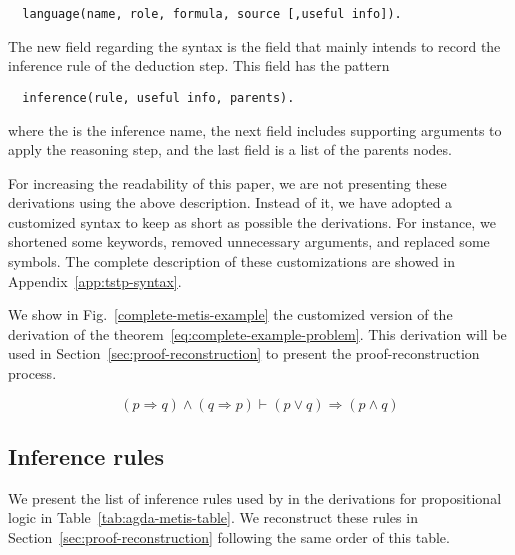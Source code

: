 \documentclass[../main.tex]{subfiles}
\begin{document}
\begin{verbatim}
  language(name, role, formula, source [,useful info]).
\end{verbatim}

The new field regarding the \TPTP syntax is the  field
that mainly intends to record the inference rule of the deduction step.
This field has the pattern

\begin{verbatim}
  inference(rule, useful info, parents).
\end{verbatim}

where the  is the inference name, the next field
includes supporting arguments to apply the reasoning step, and the
last field is a list of the parents nodes.

For increasing the readability of this paper, we are not presenting these \TSTP
derivations using the above description. Instead of it, we have adopted a
customized \TSTP syntax to keep as short as possible the \Metis derivations. For
instance,  we shortened some keywords, removed unnecessary arguments, and
replaced some symbols. The complete description of these customizations are
showed in Appendix~\ref{app:tstp-syntax}.

\begin{myexamplenum}
\label{fig:metis-example-tree}
We show in Fig.~\ref{complete-metis-example} the customized version
of the \Metis derivation of the theorem~\eqref{eq:complete-example-problem}.
This derivation will be used in Section~\ref{sec:proof-reconstruction} to
present the proof-reconstruction process.

\begin{equation}
\label{eq:complete-example-problem}
(p \Rightarrow q) \wedge (q \Rightarrow p) ⊢ (p \vee q) \Rightarrow (p \wedge q)
\end{equation}



\end{myexamplenum}



\subsection{Inference rules}
\label{ssec:metis-inferences-rules}

We present the list of inference rules used by \Metis in the \TSTP derivations
for propositional logic in Table~\ref{tab:agda-metis-table}. We reconstruct
these rules in Section~\ref{sec:proof-reconstruction} following the same order
of this table.
\end{document}
